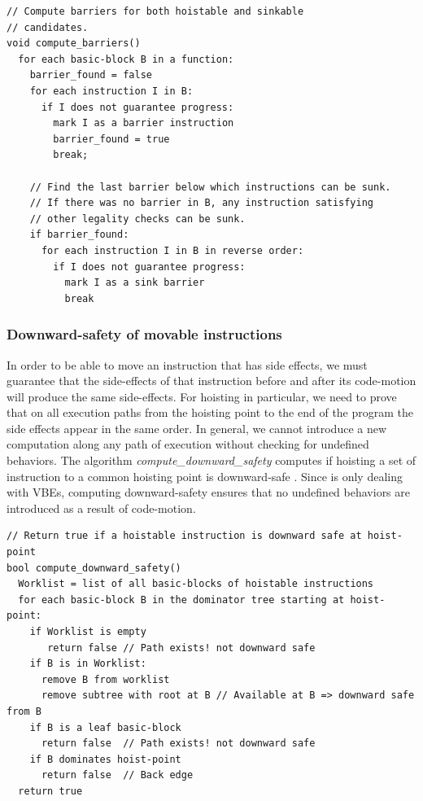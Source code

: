 \documentclass[acmlarge,review,anonymous]{acmart}\settopmatter{printfolios=true}
\begin{document}
\begin{verbatim}
// Compute barriers for both hoistable and sinkable
// candidates.
void compute_barriers()
  for each basic-block B in a function:
    barrier_found = false
    for each instruction I in B:
      if I does not guarantee progress:
        mark I as a barrier instruction
        barrier_found = true
        break;

    // Find the last barrier below which instructions can be sunk.
    // If there was no barrier in B, any instruction satisfying
    // other legality checks can be sunk.
    if barrier_found:
      for each instruction I in B in reverse order:
        if I does not guarantee progress:
          mark I as a sink barrier
          break
\end{verbatim}

\subsubsection{Downward-safety of movable instructions}

In order to be able to move an instruction that has side effects, we must
guarantee that the side-effects of that instruction before and after its
code-motion will produce the same side-effects.  For hoisting in particular, we
need to prove that on all execution paths from the hoisting point to the end of
the program the side effects appear in the same order. In general, we cannot
introduce a new computation along any path of execution without checking for
undefined behaviors. The algorithm \emph{compute\_downward\_safety} computes if
hoisting a set of instruction to a common hoisting point is downward-safe
\cite{steven1997advanced}. Since \GCM{} is only dealing with VBEs, computing
downward-safety ensures that no undefined behaviors are introduced as a result
of code-motion.
\newline
\begin{verbatim}
// Return true if a hoistable instruction is downward safe at hoist-point
bool compute_downward_safety()
  Worklist = list of all basic-blocks of hoistable instructions
  for each basic-block B in the dominator tree starting at hoist-point:
    if Worklist is empty
       return false // Path exists! not downward safe
    if B is in Worklist:
      remove B from worklist
      remove subtree with root at B // Available at B => downward safe from B
    if B is a leaf basic-block
      return false  // Path exists! not downward safe
    if B dominates hoist-point
      return false  // Back edge
  return true
\end{verbatim}
\end{document}
